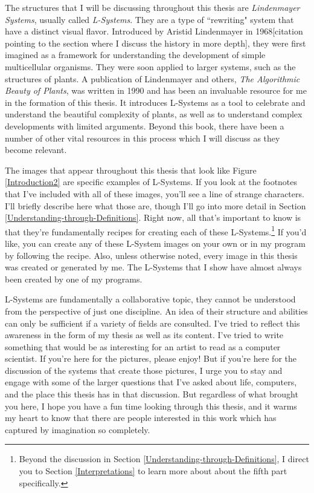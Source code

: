 \documentclass[12pt,twoside]{reedthesis}
\begin{document}
The structures that I will be discussing throughout this thesis are \textit{Lindenmayer Systems}, usually called \textit{L-Systems}. They are a type of ``rewriting" system that have a distinct visual flavor. Introduced by Aristid Lindenmayer in 1968[citation pointing to the section where I discuss the history in more depth], they were first imagined as a framework for understanding the development of simple multicellular organisms. They were soon applied to larger systems, such as the structures of plants. A publication of Lindenmayer and others, \textit{The Algorithmic Beauty of Plants}, was written in 1990 and has been an invaluable resource for me in the formation of this thesis. It introduces L-Systems as a tool to celebrate and understand the beautiful complexity of plants, as well as to understand complex developments with limited arguments. Beyond this book, there have been a number of other vital resources in this process which I will discuss as they become relevant.

The images that appear throughout this thesis that look like Figure \ref{Introduction2} are specific examples of L-Systems. If you look at the footnotes that I've included with all of these images, you'll see a line of strange characters. I'll briefly describe here what those are, though I'll go into more detail in Section \ref{Understanding-through-Definitions}. Right now, all that's important to know is that they're fundamentally recipes for creating each of these L-Systems.\footnote{Beyond the discussion in Section \ref{Understanding-through-Definitions}, I direct you to Section \ref{Interpretations} to learn more about about the fifth part specifically.} If you'd like, you can create any of these L-System images on your own or in my program by following the recipe.  Also, unless otherwise noted, every image in this thesis was created or generated by me. The L-Systems that I show have almost always been created by one of my programs. 

L-Systems are fundamentally a collaborative topic, they cannot be understood from the perspective of just one discipline. An idea of their structure and abilities can only be sufficient if a variety of fields are consulted. I've tried to reflect this awareness in the form of my thesis as well as its content. I've tried to write something that would be as interesting for an artist to read as a computer scientist. If you're here for the pictures, please enjoy! But if you're here for the discussion of the systems that create those pictures, I urge you to stay and engage with some of the larger questions that I've asked about life, computers, and the place this thesis has in that discussion. But regardless of what brought you here, I hope you have a fun time looking through this thesis, and it warms my heart to know that there are people interested in this work which has captured by imagination so completely.
\end{document}
